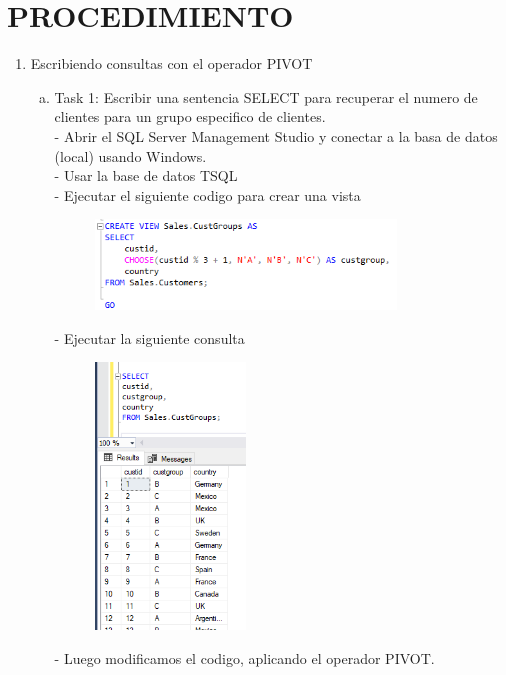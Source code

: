 \section{PROCEDIMIENTO} 


\begin{enumerate}[1.]
	\item Escribiendo consultas con el operador PIVOT
	\begin{enumerate}[a)]
	\item Task 1: Escribir una sentencia SELECT para recuperar el numero de clientes para un grupo especifico de clientes.\\
		-  Abrir el SQL Server Management Studio y conectar a la basa de datos (local) usando Windows.\\
		-  Usar la base de datos TSQL\\
		-  Ejecutar el siguiente codigo para crear una vista\\
		\begin{figure}[H]
\begin{center}
\includegraphics[width=8cm]{./Imagenes/1-1}
\end{center}
\end{figure}
		-  Ejecutar la siguiente consulta
\begin{figure}[H]
\begin{center}
\includegraphics[width=4cm]{./Imagenes/1-2}
\end{center}
\end{figure}
		-  Luego modificamos el codigo, aplicando el operador PIVOT.
\begin{figure}[H]

\end{figure}
\end{enumerate}
\end{enumerate}
